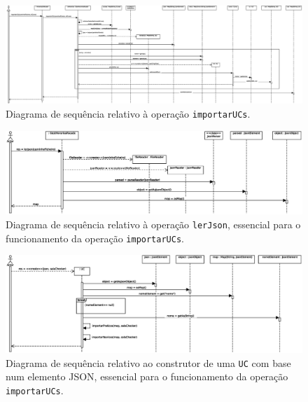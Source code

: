 \documentclass[12pt, a4paper]{article}
\begin{document}
\begin{landscape}
        \vspace*{\fill}
        \pagebreak
        \vspace*{\fill}

        \begin{figure}[H]
            \centering
            \includegraphics[scale=0.40]{Imagens/Modelos/importarUCs.svg.eps}
            \caption{
                Diagrama de sequência relativo à operação \texttt{importarUCs}.
            }
        \end{figure}

        \vspace*{\fill}
        \pagebreak
        \vspace*{\fill}

        \begin{figure}[H]
            \centering
            \includegraphics[scale=0.80]{Imagens/Modelos/lerJSON.svg.eps}
            \caption{
                Diagrama de sequência relativo à operação \texttt{lerJson}, essencial para o
                funcionamento da operação \texttt{importarUCs}.
            }
        \end{figure}

        \vspace*{\fill}
        \pagebreak
        \vspace*{\fill}

        \begin{figure}[H]
            \centering
            \includegraphics[scale=0.8]{Imagens/Modelos/importarUCsConstrutorUC.svg.eps}
            \caption{
                Diagrama de sequência relativo ao construtor de uma \texttt{UC} com base num
                elemento JSON, essencial para o funcionamento da operação \texttt{importarUCs}.
            }
        \end{figure}


\end{landscape}
\end{document}
